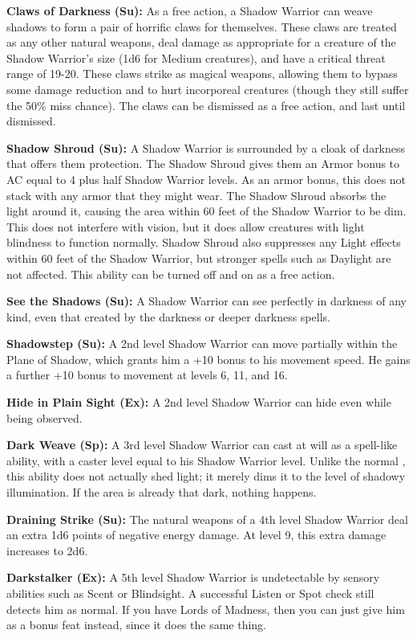 \textbf{Claws of Darkness (Su):} As a free action, a Shadow Warrior can weave shadows to form a pair of horrific claws for themselves. These claws are treated as any other natural weapons, deal damage as appropriate for a creature of the Shadow Warrior’s size (1d6 for Medium creatures), and have a critical threat range of 19-20. These claws strike as magical weapons, allowing them to bypass some damage reduction and to hurt incorporeal creatures (though they still suffer the 50\% miss chance). The claws can be dismissed as a free action, and last until dismissed.

\textbf{Shadow Shroud (Su):} A Shadow Warrior is surrounded by a cloak of darkness that offers them protection. The Shadow Shroud gives them an Armor bonus to AC equal to 4 plus half Shadow Warrior levels. As an armor bonus, this does not stack with any armor that they might wear. The Shadow Shroud absorbs the light around it, causing the area within 60 feet of the Shadow Warrior to be dim. This does not interfere with vision, but it does allow creatures with light blindness to function normally. Shadow Shroud also suppresses any Light effects within 60 feet of the Shadow Warrior, but stronger spells such as Daylight are not affected. This ability can be turned off and on as a free action.

\textbf{See the Shadows (Su):} A Shadow Warrior can see perfectly in darkness of any kind, even that created by the darkness or deeper darkness spells.

\textbf{Shadowstep (Su):} A 2nd level Shadow Warrior can move partially within the Plane of Shadow, which grants him a +10 bonus to his movement speed. He gains a further +10 bonus to movement at levels 6, 11, and 16.

\textbf{Hide in Plain Sight (Ex):} A 2nd level Shadow Warrior can hide even while being observed.

\textbf{Dark Weave (Sp):} A 3rd level Shadow Warrior can cast  at will as a spell-like ability, with a caster level equal to his Shadow Warrior level. Unlike the normal , this ability does not actually shed light; it merely dims it to the level of shadowy illumination. If the area is already that dark, nothing happens.

\textbf{Draining Strike (Su):} The natural weapons of a 4th level Shadow Warrior deal an extra 1d6 points of negative energy damage. At level 9, this extra damage increases to 2d6.

\textbf{Darkstalker (Ex):} A 5th level Shadow Warrior is undetectable by sensory abilities such as Scent or Blindsight. A successful Listen or Spot check still detects him as normal. If you have Lords of Madness, then you can just give him  as a bonus feat instead, since it does the same thing.

